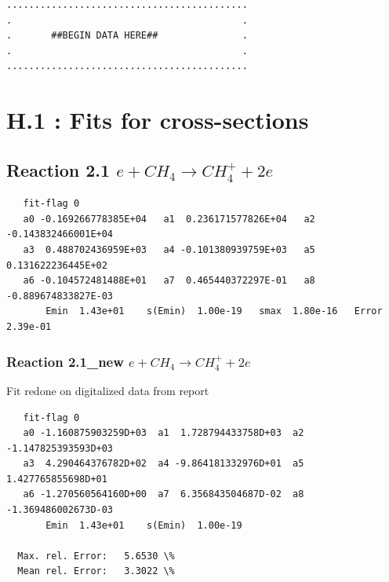 \documentclass[12pt,dvipdfmx]{article}
\begin{document}
\bigskip
\begin{small}\begin{verbatim}
...........................................
.                                         .
.       ##BEGIN DATA HERE##               .
.                                         .
...........................................
\end{verbatim}\end{small}
\newpage
\renewcommand{\theHsection}{arabicsection.\thesection}
\renewcommand\thesection{\arabic{section}}
\setcounter{section}{0}
\section{H.1 :  Fits for cross-sections}

\subsection{ Reaction 2.1  $e + CH_4 \rightarrow CH_4^+ + 2e $
}

\begin{small}\begin{verbatim}
   fit-flag 0
   a0 -0.169266778385E+04   a1  0.236171577826E+04   a2 -0.143832466001E+04
   a3  0.488702436959E+03   a4 -0.101380939759E+03   a5  0.131622236445E+02
   a6 -0.104572481488E+01   a7  0.465440372297E-01   a8 -0.889674833827E-03
       Emin  1.43e+01    s(Emin)  1.00e-19   smax  1.80e-16   Error  2.39e-01
\end{verbatim}\end{small}

\subsubsection{ Reaction 2.1\mbox{\_new} $e + CH_4 \rightarrow CH_4^+ + 2e $ }

Fit redone on digitalized data from report
\begin{small}\begin{verbatim}
   fit-flag 0
   a0 -1.160875903259D+03  a1  1.728794433758D+03  a2 -1.147825393593D+03
   a3  4.290464376782D+02  a4 -9.864181332976D+01  a5  1.427765855698D+01
   a6 -1.270560564160D+00  a7  6.356843504687D-02  a8 -1.369486002673D-03
       Emin  1.43e+01    s(Emin)  1.00e-19

  Max. rel. Error:   5.6530 \%
  Mean rel. Error:   3.3022 \%
\end{verbatim}\end{small}
\end{document}

